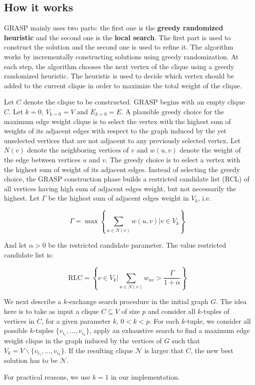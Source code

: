 
\subsection{How it works}

GRASP mainly uses two parts: the first one is the \textbf{greedy randomized heuristic}
and the second one is the \textbf{local search}. The first part is used to
construct the solution and the second one is used to refine it. The algorithm
works by incrementally constructing solutions using greedy randomization. At each
step, the algorithm chooses the next vertex of the clique using a greedy
randomized heuristic. The heuristic is used to decide which vertex should be
added to the current clique in order to maximize the total weight of the clique.
\bigskip

Let $C$ denote the clique to be constructed. GRASP begins with an empty clique $C$.
Let $k=0$, $V_{k=0}=V$ and $E_{k=0}=E$. A plausible greedy choice for the maximum
edge weight clique is to select the vertex with the highest sum of weights of its
adjacent edges with respect to the graph induced by the yet unselected vertices
that are not adjacent to any previously selected vertex. Let $N(v)$ denote the
neighboring vertices of $v$ and $w(u,v)$ denote the weight of the edge between
vertices $u$ and $v$. The greedy choice is to select a vertex with the highest
sum of weight of its adjacent edges. Instead of selecting the greedy choice,
the GRASP construction phase builds a restricted candidate list (RCL) of all
vertices having high sum of adjacent edges weight, but not necessarily the
highest. Let $\Gamma$ be the highest sum of adjacent edges weight in $V_k$, i.e.
\bigskip

$$\Gamma=\max\left\{\sum_{u\in N(v)}w(u,v)|v\in V_k\right\}$$
\bigskip

And let $\alpha>0$ be the restricted candidate parameter. The value restricted
candidate list is:
\bigskip

$$\text{RLC}=\left\{v\in V_k|\sum_{u\in N(v)}w_{uv}>\frac{\Gamma}{1+\alpha}\right\}$$
\bigskip

We next describe a $k$-exchange search procedure in the initial graph $G$. The
idea here is to take as input a clique $C\subseteq V$ of size $p$ and consider
all $k$-tuples of vertices in $C$, for a given parameter $k$, $0<k<p$. For each
$k$-tuple, we consider all possible $k$-tuples $\{v_{i_1},...,v_{i_k}\}$, apply 
an exhaustive search to find a maximum edge weight clique in the graph induced 
by the vertices of $G$ such that $V_k=V\backslash\{v_{i_1},...,v_{i_k}\}$. 
If the resulting clique $\mathcal{N}$ is larger that $C$, the new best solution 
has to be $\mathcal{N}$.
\bigskip

For practical reasons, we use $k=1$ in our implementation.